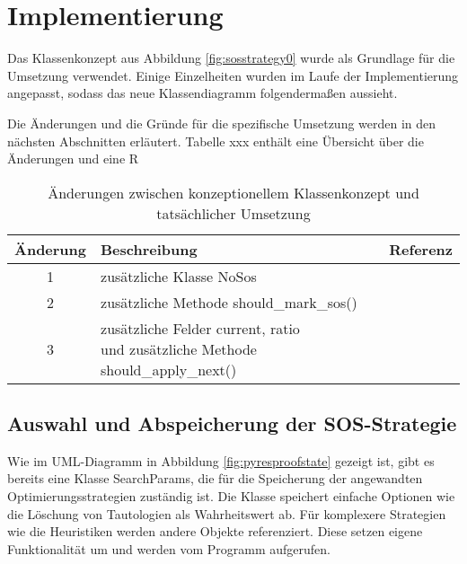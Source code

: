
\chapter{Implementierung}

Das Klassenkonzept aus Abbildung \ref{fig:sosstrategy0} wurde als Grundlage für die Umsetzung verwendet. Einige Einzelheiten wurden im Laufe der Implementierung angepasst, sodass das neue Klassendiagramm folgendermaßen aussieht.



Die Änderungen und die Gründe für die spezifische Umsetzung werden in den nächsten Abschnitten erläutert. Tabelle xxx enthält eine Übersicht über die Änderungen und eine R
\begin{table}
	\centering
	\begin{tabular}{|c|l|c|}
		\hline
		Änderung & Beschreibung & Referenz \\
		\hline
		1 & zusätzliche Klasse NoSos &  \\
		\hline
		2 & zusätzliche Methode should\_mark\_sos() &  \\
		\hline
		3 & \cellbreak{l}{zusätzliche Felder current, ratio \\ und zusätzliche Methode should\_apply\_next()} &  \\
		\hline
	\end{tabular}
	\caption{Änderungen zwischen konzeptionellem Klassenkonzept und tatsächlicher Umsetzung}
	\label{table:difference_sos_classes}
\end{table}

\section{Auswahl und Abspeicherung der SOS-Strategie}

Wie im UML-Diagramm in Abbildung \ref{fig:pyresproofstate} gezeigt ist, gibt es bereits eine Klasse
SearchParams, die für die Speicherung der angewandten Optimierungsstrategien zuständig ist. Die Klasse speichert einfache Optionen wie die Löschung von Tautologien als Wahrheitswert ab. Für komplexere Strategien wie die Heuristiken werden andere Objekte referenziert. Diese setzen eigene Funktionalität um und werden vom Programm aufgerufen.

